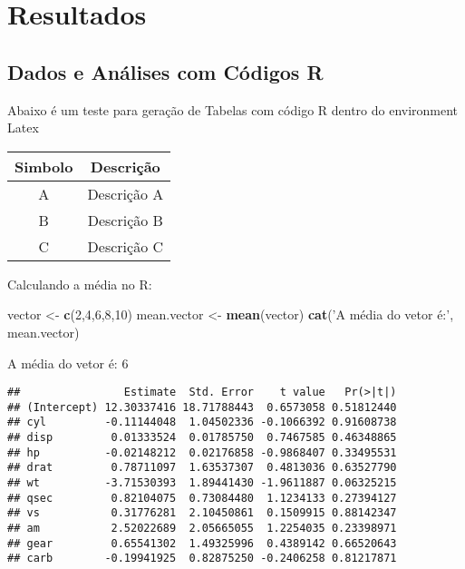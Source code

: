 \documentclass[12pt,openright,oneside,a4paper,chapter=TITLE,section=TITLE,subsection=Title,english,french,spanish,portugues,sumario=tradicional]{04-class-files/abntex2}
\newenvironment{Shaded}{\begin{snugshade}}{\end{snugshade}}
\newcommand{\DataTypeTok}[1]{\textcolor[rgb]{0.13,0.29,0.53}{#1}}
\newcommand{\DecValTok}[1]{\textcolor[rgb]{0.00,0.00,0.81}{#1}}
\newcommand{\KeywordTok}[1]{\textcolor[rgb]{0.13,0.29,0.53}{\textbf{#1}}}
\newcommand{\NormalTok}[1]{#1}
\newcommand{\OperatorTok}[1]{\textcolor[rgb]{0.81,0.36,0.00}{\textbf{#1}}}
\newcommand{\StringTok}[1]{\textcolor[rgb]{0.31,0.60,0.02}{#1}}
\begin{document}
\part{Resultados}

\chapter{Dados e Análises com Códigos R}

Abaixo é um teste para geração de Tabelas com código R dentro do environment Latex

\begin{tabular}{c|c}
\hline
Simbolo & Descrição\\
\hline
A & Descrição A\\
\hline
B & Descrição B\\
\hline
C & Descrição C\\
\hline
\end{tabular}

Calculando a média no R:

\begin{Shaded}
\begin{Highlighting}[]
\NormalTok{vector <-}\StringTok{ }\KeywordTok{c}\NormalTok{(}\DecValTok{2}\NormalTok{,}\DecValTok{4}\NormalTok{,}\DecValTok{6}\NormalTok{,}\DecValTok{8}\NormalTok{,}\DecValTok{10}\NormalTok{)}
\NormalTok{mean.vector <-}\StringTok{ }\KeywordTok{mean}\NormalTok{(vector)}
\KeywordTok{cat}\NormalTok{(}\StringTok{'A média do vetor é:'}\NormalTok{, mean.vector)}
\end{Highlighting}
\end{Shaded}

A média do vetor é: 6

\begin{Shaded}
\end{Shaded}

\begin{verbatim}
##                Estimate  Std. Error    t value   Pr(>|t|)
## (Intercept) 12.30337416 18.71788443  0.6573058 0.51812440
## cyl         -0.11144048  1.04502336 -0.1066392 0.91608738
## disp         0.01333524  0.01785750  0.7467585 0.46348865
## hp          -0.02148212  0.02176858 -0.9868407 0.33495531
## drat         0.78711097  1.63537307  0.4813036 0.63527790
## wt          -3.71530393  1.89441430 -1.9611887 0.06325215
## qsec         0.82104075  0.73084480  1.1234133 0.27394127
## vs           0.31776281  2.10450861  0.1509915 0.88142347
## am           2.52022689  2.05665055  1.2254035 0.23398971
## gear         0.65541302  1.49325996  0.4389142 0.66520643
## carb        -0.19941925  0.82875250 -0.2406258 0.81217871
\end{verbatim}
\end{document}
